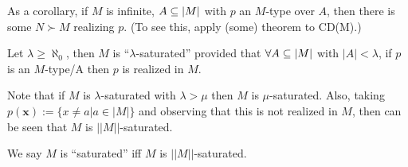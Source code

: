 As a corollary, if $M$ is infinite, $A\subseteq |M|$ with $p$ an $M$-type over $A$, then there is some $N\succ M$ realizing $p$. (To see this, apply (some) theorem to CD(M).)

\begin{boxdefinition}
    Let $\lambda \geq \aleph_0$, then $M$ is ``$\lambda$-saturated'' provided that $\forall A\subseteq |M|$ with $|A|<\lambda$, if $p$ is an $M$-type/A then $p$ is realized in $M$.
\end{boxdefinition}
Note that if $M$ is $\lambda$-saturated with $\lambda>\mu$ then $M$ is $\mu$-saturated. Also, taking $p(\textbf{x}):=\{x\neq a|a\in |M|\}$ and observing that this is not  realized in $M$, then can be seen that $M$ is $||M||$-saturated. 
\begin{boxdefinition}[Saturated]
    We say $M$ is ``saturated'' iff $M$ is $||M||$-saturated.
\end{boxdefinition}